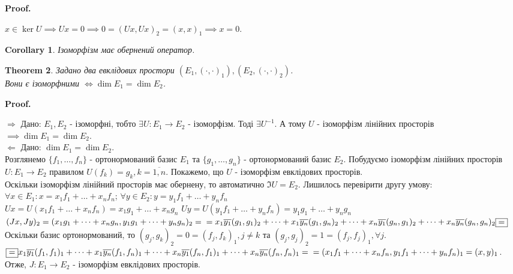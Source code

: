 \documentclass[a4paper, 10pt]{article}
\makeatletter
\def\rightproof{$\boxed{\Rightarrow}$ }
\def\leftproof{$\boxed{\Leftarrow}$ }
\theoremstyle{theoremdd}
\newtheorem{theorem}{Theorem}[subsection]
\newtheorem{corollary}[theorem]{Corollary}
\renewenvironment{proof}[1][Proof.\\]{\par
\pushQED{\hfill \qed}%
\normalfont \topsep6\p@\@plus6\p@\relax
\trivlist
\item\relax
{\bfseries
#1\@addpunct{.}}\hspace\labelsep\ignorespaces
}{%
\popQED\endtrivlist\@endpefalse
}
\makeatother
\begin{document}
\begin{proof}
$x \in \ker U \implies Ux = 0 \implies 0 = (Ux,Ux)_2 = (x,x)_1 \implies x = 0$.
\end{proof}

\begin{corollary}
Ізоморфізм має обернений оператор.
\end{corollary}

\begin{theorem}
Задано два евклідових простори $(E_1,(\cdot,\cdot)_1), (E_2,(\cdot,\cdot)_2)$.\\
Вони є ізоморфними $\iff \dim E_1 = \dim E_2$.
\end{theorem}

\begin{proof}
\rightproof Дано: $E_1,E_2$ - ізоморфні, тобто $\exists U: E_1 \to E_2$ - ізоморфізм. Тоді $\exists U^{-1}$. А тому $U$ - ізоморфізм лінійних просторів $\implies \dim E_1 = \dim E_2$.
\bigskip \\
\leftproof Дано: $\dim E_1 = \dim E_2$.\\
Розглянемо $\{f_1,\dots,f_n\}$ - ортонормований базис $E_1$ та $\{g_1,\dots,g_n\}$ - ортонормований базис $E_2$.
Побудуємо ізоморфізм лінійних просторів $U: E_1 \to E_2$ правилом $U(f_k) = g_k, k = \overline{1,n}$. Покажемо, що $U$ - ізоморфізм евклідових просторів.\\
Оскільки ізоморфізм лінійний просторів має обернену, то автоматично $\Im U = E_2$. Лишилось перевірити другу умову:\\
$\forall x \in E_1: x = x_1 f_1 + \dots + x_n f_n$; \hspace{3.2cm} $\forall y \in E_2: y = y_1 f_1 + \dots + y_n f_n$\\
$Ux = U(x_1 f_1+\dots+x_n f_n) = x_1 g_1 + \dots + x_n g_n$ \hspace{1cm} $Uy = U(y_1 f_1+\dots+y_n f_n) = y_1 g_1 + \dots + y_n g_n$\\
$(Jx,Jy)_2 = (x_1 g_1+\dots+x_n g_n, y_1 g_1 + \dots + y_n g_n)_2 = \\
= x_1 \overline{y_1} (g_1,g_1)_2 + \dots + x_1 \overline{y_n} (g_1,g_n)_2 + \dots + x_n \overline{y_1} (g_n, g_1)_2 + \dots + x_n \overline{y_n} (g_n,g_n)_2 \boxed{=}$\\
Оскільки базис ортонормований, то $(g_j,g_k)_2 = 0 = (f_j,f_k)_1, j \neq k$ та $(g_j,g_j)_2 = 1 = (f_j,f_j)_1, \forall j$.\\
$\boxed{=} x_1 \overline{y_1} (f_1,f_1)_1 + \dots + x_1 \overline{y_n} (f_1,f_n)_1 + \dots + x_n \overline{y_1} (f_n, f_1)_1 + \dots + x_n \overline{y_n} (f_n,f_n)_1 = \\
= (x_1f_1+\dots+x_nf_n, y_1f_1+\dots+y_nf_n)_1 = (x,y)_1$.\\
Отже, $J: E_1 \to E_2$ - ізоморфізм евклідових просторів.
\end{proof}
\end{document}
